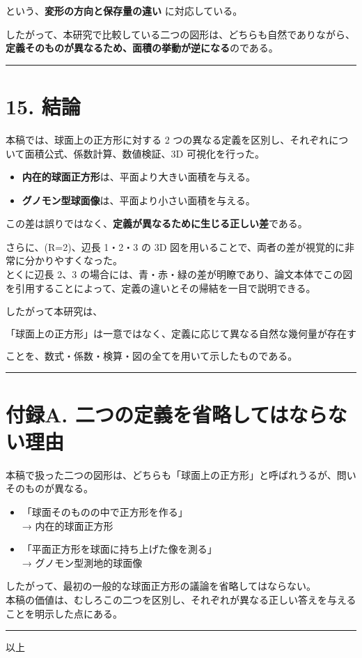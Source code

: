 \documentclass[
  12pt,
  a4paper,
]{article}
\providecommand{\tightlist}{%
  \setlength{\itemsep}{0pt}\setlength{\parskip}{0pt}}
\begin{document}
という、\textbf{変形の方向と保存量の違い} に対応している。

したがって、本研究で比較している二つの図形は、どちらも自然でありながら、\textbf{定義そのものが異なるため、面積の挙動が逆になる}のである。

\begin{center}\rule{0.5\linewidth}{0.5pt}\end{center}

\section{15. 結論}\label{ux7d50ux8ad6}

本稿では、球面上の正方形に対する 2
つの異なる定義を区別し、それぞれについて面積公式、係数計算、数値検証、3D
可視化を行った。

\begin{itemize}
\tightlist
\item
  \textbf{内在的球面正方形}は、平面より大きい面積を与える。\\
\item
  \textbf{グノモン型球面像}は、平面より小さい面積を与える。
\end{itemize}

この差は誤りではなく、\textbf{定義が異なるために生じる正しい差}である。

さらに、(R=2)、辺長 1・2・3 の 3D
図を用いることで、両者の差が視覚的に非常に分かりやすくなった。\\
とくに辺長 2、3
の場合には、青・赤・緑の差が明瞭であり、論文本体でこの図を引用することによって、定義の違いとその帰結を一目で説明できる。

したがって本研究は、

\[
\boxed{
\text{「球面上の正方形」は一意ではなく、定義に応じて異なる自然な幾何量が存在する}
}
\]

ことを、数式・係数・検算・図の全てを用いて示したものである。

\begin{center}\rule{0.5\linewidth}{0.5pt}\end{center}

\section{付録A.
二つの定義を省略してはならない理由}\label{ux4ed8ux9332a.-ux4e8cux3064ux306eux5b9aux7fa9ux3092ux7701ux7565ux3057ux3066ux306fux306aux3089ux306aux3044ux7406ux7531}

本稿で扱った二つの図形は、どちらも「球面上の正方形」と呼ばれうるが、問いそのものが異なる。

\begin{itemize}
\item
  「球面そのものの中で正方形を作る」\\
  → 内在的球面正方形
\item
  「平面正方形を球面に持ち上げた像を測る」\\
  → グノモン型測地的球面像
\end{itemize}

したがって、最初の一般的な球面正方形の議論を省略してはならない。\\
本稿の価値は、むしろこの二つを区別し、それぞれが異なる正しい答えを与えることを明示した点にある。

\begin{center}\rule{0.5\linewidth}{0.5pt}\end{center}

以上
\end{document}

